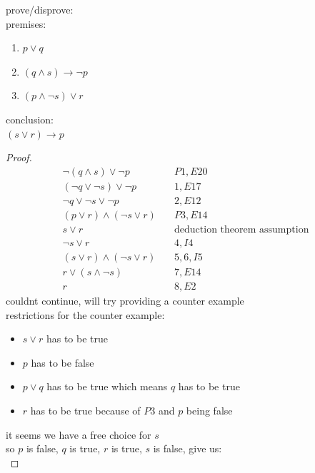 \documentclass[a4paper,12pt]{article}
\begin{document}
\begin{question}
prove/disprove:\\[0pt]
premises:\\[0pt]
\begin{enumerate}
\item \(p \lor q\)\\[0pt]
\item \((q \land s) \to \lnot p\)\\[0pt]
\item \((p \land \lnot s) \lor r\)\\[0pt]
\end{enumerate}
conclusion:\\[0pt]
\((s \lor r) \to p\)\\[0pt]
\begin{proof}
\begin{align}
  \lnot (q \land s) \lor \lnot p &\quad P1,E20\\
  (\lnot q \lor \lnot s) \lor \lnot p &\quad 1,E17\\
  \lnot q \lor \lnot s \lor \lnot p &\quad 2,E12\\
  (p \lor r) \land (\lnot s \lor r) &\quad P3,E14\\
  s \lor r &\quad \text{deduction theorem assumption}\\
  \lnot s \lor r &\quad 4,I4\\
  (s \lor r) \land (\lnot s \lor r) &\quad 5,6,I5\\
  r \lor (s \land \lnot s) &\quad 7,E14\\
  r &\quad 8,E2
\end{align}
couldnt continue, will try providing a counter example\\[0pt]
restrictions for the counter example:\\[0pt]
\begin{itemize}
\item \(s \lor r\) has to be true\\[0pt]
\item \(p\) has to be false\\[0pt]
\item \(p \lor q\) has to be true which means \(q\) has to be true\\[0pt]
\item \(r\) has to be true because of \(P3\) and \(p\) being false\\[0pt]
\end{itemize}
it seems we have a free choice for \(s\)\\[0pt]
so \(p\) is false, \(q\) is true, \(r\) is true, \(s\) is false, give us:\\[0pt]

\end{proof}
\end{question}
\end{document}
